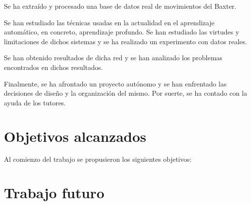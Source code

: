 Se ha extraído y procesado una base de datos real de movimientos del Baxter.

Se han estudiado las técnicas usadas en la actualidad en el aprendizaje automático, en concreto, aprendizaje profundo. Se han estudiado las virtudes y limitaciones de dichos sistemas y se ha realizado un experimento con datos reales.

Se han obtenido resultados de dicha red y se han analizado los problemas encontrados en dichos resultados.

Finalmente, se ha afrontado un proyecto autónomo y se han enfrentado las decisiones de diseño y la organización del mismo. Por suerte, se ha contado con la ayuda de los tutores.
\section{Objetivos alcanzados}
Al comienzo del trabajo se propusieron los siguientes objetivos:


\section{Trabajo futuro}

